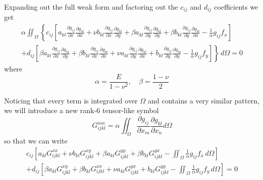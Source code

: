 \documentclass[11pt]{article}
\newcommand\p[2]{\frac{\partial #1}{\partial #2}}
\newcommand\G[6]{\p{g_{#1 #2}}{#5}\p{g_{#3 #4}}{#6}}
\begin{document}
Expanding out the full weak form and factoring out the $c_{ij}$ and $d_{ij}$ coefficients we get
\begin{multline}
  \alpha \iint_\Omega \left\{
    c_{ij} \left[
      a_{kl}\G{i}{j}{k}{l}{x}{x} + \nu b_{kl}\G{i}{j}{k}{l}{x}{y}
      + \beta a_{kl}\G{i}{j}{k}{l}{y}{y} + \beta b_{kl}\G{i}{j}{k}{l}{y}{x}
      - \frac{1}{\alpha}g_{ij}f_x
    \right] \right. \\ \left.
    + d_{ij} \left[
      \beta a_{kl}\G{i}{j}{k}{l}{x}{y} + \beta b_{kl}\G{i}{j}{k}{l}{x}{x}
      + \nu a_{kl}\G{i}{j}{k}{l}{y}{x} + b_{kl}\G{i}{j}{k}{l}{y}{y}
      - \frac{1}{\alpha}g_{ij}f_y
    \right]
  \right\} \, d\Omega = 0
\end{multline}
where
\begin{equation}
  \alpha = \frac{E}{1-\nu^2}, \quad \beta = \frac{1-\nu}{2}
\end{equation}

Noticing that every term is integrated over $\Omega$ and contains a very similar pattern, we will introduce a new rank-6 tensor-like symbol
\begin{equation}
  G_{ijkl}^{mn} = \alpha \iint_\Omega \p{g_{ij}}{x_m} \p{g_{kl}}{x_n} d\Omega
\end{equation}
so that we can write
\begin{multline}
    c_{ij} \left[
      a_{kl} G_{ijkl}^{xx} + \nu b_{kl} G_{ijkl}^{xy}
      + \beta a_{kl} G_{ijkl}^{yy} + \beta b_{kl} G_{ijkl}^{yx}
      - \iint_\Omega \frac{1}{\alpha}g_{ij}f_x \, d\Omega
    \right] \\
  + d_{ij} \left[
    \beta a_{kl} G_{ijkl}^{xy} + \beta b_{kl} G_{ijkl}^{xx}
    + \nu a_{kl} G_{ijkl}^{yx} + b_{kl} G_{ijkl}^{yy}
    - \iint_\Omega \frac{1}{\alpha}g_{ij}f_y \, d\Omega
  \right] = 0
\end{multline}
\end{document}
